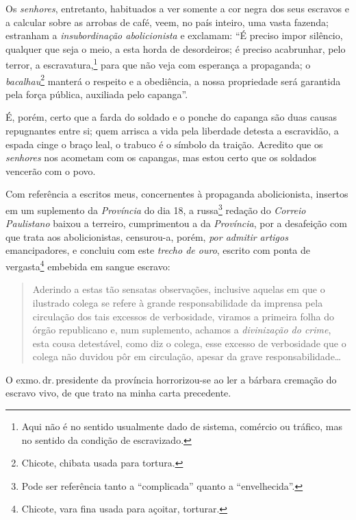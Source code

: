 Os \emph{senhores}, entretanto, habituados a ver somente a cor negra dos
seus escravos e a calcular sobre as arrobas de café, veem, no país
inteiro, uma vasta fazenda; estranham a \emph{insubordinação
abolicionista} e exclamam: ``É preciso impor silêncio, qualquer que seja
o meio, a esta horda de desordeiros; é preciso acabrunhar, pelo terror,
a escravatura,\footnote{Aqui não é no sentido usualmente dado de
  sistema, comércio ou tráfico, mas no sentido da condição de
  escravizado.} para que não veja com esperança a propaganda; o
\emph{bacalhau}\footnote{Chicote, chibata usada para tortura.} manterá
o respeito e a obediência, a nossa propriedade será garantida pela força
pública, auxiliada pelo capanga''.

É, porém, certo que a farda do soldado e o ponche do capanga são duas
causas repugnantes entre si; quem arrisca a vida pela liberdade detesta
a escravidão, a espada cinge o braço leal, o trabuco é o símbolo da
traição. Acredito que os \emph{senhores} nos acometam com os capangas,
mas estou certo que os soldados vencerão com o povo.

Com referência a escritos meus, concernentes à propaganda abolicionista,
insertos em um suplemento da \emph{Província} do dia 18, a
russa\footnote{Pode ser referência tanto a ``complicada'' quanto a
  ``envelhecida''.} redação do \emph{Correio Paulistano} baixou a terreiro,
cumprimentou a da \emph{Província}, por a desafeição com que trata aos
abolicionistas, censurou-a, porém, \emph{por admitir artigos}
emancipadores, e concluiu com este \emph{trecho de ouro}, escrito com
ponta de vergasta\footnote{Chicote, vara fina usada para açoitar,
  torturar.} embebida em sangue escravo:

\begin{quote}
Aderindo a estas tão sensatas observações, inclusive aquelas em que o
ilustrado colega se refere à grande responsabilidade da imprensa pela
circulação dos tais excessos de verbosidade, viramos a primeira folha do
órgão republicano e, num suplemento, achamos a \emph{divinização do
crime}, esta cousa detestável, como diz o colega, esse excesso de
verbosidade que o colega não duvidou pôr em circulação, apesar da grave
responsabilidade\ldots{}
\end{quote}

O exmo.\,dr.\,presidente da província horrorizou-se ao ler a bárbara
cremação do escravo vivo, de que trato na minha carta precedente.

